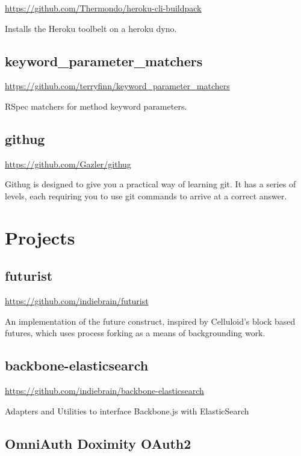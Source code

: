 \documentclass[12pt letterpaper notitlepage]{article}
\begin{document}
\url{https://github.com/Thermondo/heroku-cli-buildpack}

Installs the Heroku toolbelt on a heroku dyno.

\subsection*{keyword\_parameter\_matchers}
\label{sec:orge0c0eb6}

\url{https://github.com/terryfinn/keyword\_parameter\_matchers}

RSpec matchers for method keyword parameters.

\subsection*{githug}
\label{sec:orga9f9268}

\url{https://github.com/Gazler/githug}

Githug is designed to give you a practical way of learning git. It has a series of levels, each requiring you to use git commands to arrive at a correct answer.

\section*{Projects}
\label{sec:orgfabaf7e}

\subsection*{futurist}
\label{sec:org0be54ad}

\url{https://github.com/indiebrain/futurist}

An implementation of the future construct, inspired by Celluloid's block based futures, which uses process forking as a means of backgrounding work.

\subsection*{backbone-elasticsearch}
\label{sec:orge797723}

\url{https://github.com/indiebrain/backbone-elasticsearch}

Adapters and Utilities to interface Backbone.js with ElasticSearch

\subsection*{OmniAuth Doximity OAuth2}
\label{sec:orge0b106b}
\end{document}
